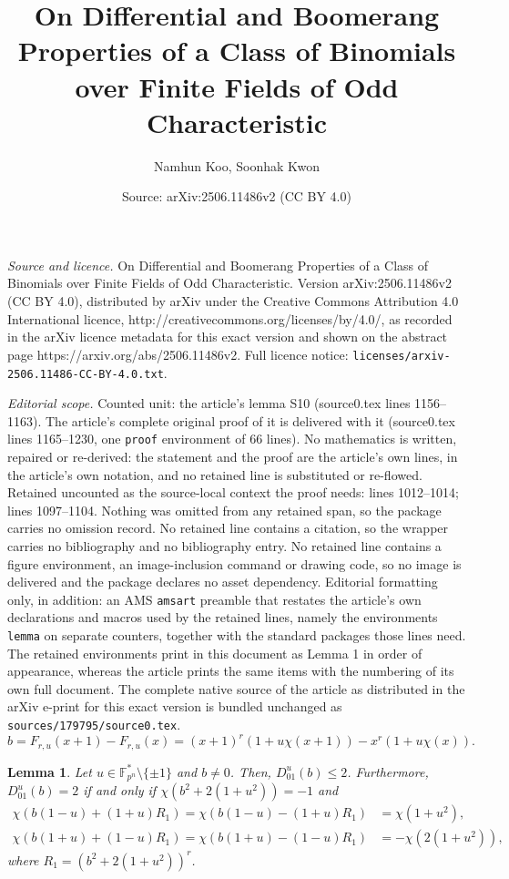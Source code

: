 \documentclass[10pt,a4paper]{amsart}
\title{On Differential and Boomerang Properties of a Class of Binomials over Finite Fields of Odd Characteristic}
\author{Namhun Koo, Soonhak Kwon}
\date{Source: arXiv:2506.11486v2 (CC BY 4.0)}
\newtheorem{lemma}{Lemma}
\newcommand{\Fpnmul}{\mathbb{F}_{p^n}^*}
\begin{document}
\maketitle

\noindent\emph{Source and licence.} On Differential and Boomerang Properties of a Class of Binomials over Finite Fields of Odd Characteristic. Version arXiv:2506.11486v2 (CC BY 4.0), distributed by arXiv under the Creative Commons Attribution 4.0 International licence, http://creativecommons.org/licenses/by/4.0/, as recorded in the arXiv licence metadata for this exact version and shown on the abstract page https://arxiv.org/abs/2506.11486v2. Full licence notice: \texttt{licenses/arxiv-2506.11486-CC-BY-4.0.txt}.\par\smallskip

\noindent\textit{Editorial scope.} Counted unit: the article's lemma S10 (source0.tex lines 1156--1163). The article's complete original proof of it is delivered with it (source0.tex lines 1165--1230, one \texttt{proof} environment of 66 lines). No mathematics is written, repaired or re-derived: the statement and the proof are the article's own lines, in the article's own notation, and no retained line is substituted or re-flowed.  Retained uncounted as the source-local context the proof needs: lines 1012--1014; lines 1097--1104.  Nothing was omitted from any retained span, so the package carries no omission record.  No retained line contains a citation, so the wrapper carries no bibliography and no bibliography entry.  No retained line contains a figure environment, an image-inclusion command or drawing code, so no image is delivered and the package declares no asset dependency.  Editorial formatting only, in addition: an AMS \texttt{amsart} preamble that restates the article's own declarations and macros used by the retained lines, namely the environments \texttt{lemma} on separate counters, together with the standard packages those lines need.  The retained environments print in this document as Lemma 1 in order of appearance, whereas the article prints the same items with the numbering of its own full document.  The complete native source of the article as distributed in the arXiv e-print for this exact version is bundled unchanged as \texttt{sources/179795/source0.tex}.
\begin{equation}\label{DU_eqn}
	b=F_{r,u}(x+1)-F_{r,u}(x) = (x+1)^r(1+u\chi(x+1)) - x^r (1+u\chi(x)).
\end{equation}

\begin{lemma}\label{DU_lemma S01}
	Let $u\in \Fpnmul \setminus \{\pm1\}$ and $b\ne 0$. Then, $D_{01}^u(b)\le 2$. Furthermore, $D_{01}^u(b) = 2$ if and only if $\chi(b^2+2(1+u^2))=-1$ and 
	\begin{align*}
		\chi(b(1-u)+(1+u)R_1) = \chi(b(1-u)-(1+u)R_1) &= \chi(1+u^2),\\
		\chi(b(1+u)+(1-u)R_1) = \chi(b(1+u)-(1-u)R_1) &= -\chi(2(1+u^2)),
	\end{align*}
	where $R_1  = (b^2+2(1+u^2))^r$.
\end{lemma}
\end{document}
